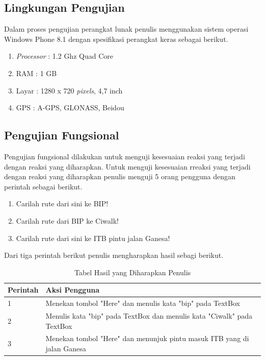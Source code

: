 \subsection{Lingkungan Pengujian}
\label{lab:Lingkungan Pengujian}
\hspace{0.5cm} Dalam proses pengujian perangkat lunak penulis menggunakan sistem operasi Windows Phone 8.1 dengan spesifikasi perangkat keras sebagai berikut.
\begin{enumerate}
	\item \textit{Processor} : 1.2 Ghz Quad Core
	\item RAM : 1 GB
	\item Layar : 1280 x 720 \textit{pixels}, 4,7 inch
	\item GPS : A-GPS, GLONASS, Beidou
\end{enumerate}

\subsection{Pengujian Fungsional}
\label{lab:Pengujian Fungsional}
\hspace{0.5cm} Pengujian fungsional dilakukan untuk menguji kesesuaian reaksi yang terjadi dengan reaksi yang diharapkan. Untuk menguji kesesuaian rreaksi yang terjadi dengan reaksi yang diharapkan penulis menguji 5 orang pengguna dengan perintah sebagai berikut. 
\begin{enumerate}
	\item Carilah rute dari sini ke BIP!
	\item Carilah rute dari BIP ke Ciwalk!
	\item Carilah rute dari sini ke ITB pintu jalan Ganesa!
\end{enumerate}

Dari tiga perintah berikut penulis mengharapkan hasil sebagi berikut.
\begin{table}[h]
	\centering
		\begin{tabular}{|p{2cm}|p{10cm}|}\hline
				Perintah & Aksi Pengguna \\ \hline
				1 & Menekan tombol "Here" dan menulis kata "bip" pada TextBox \\ \hline
				2 & Menulis kata "bip" pada TextBox dan menulis kata "Ciwalk" pada TextBox \\ \hline
				3 & Menekan tombol "Here" dan menunjuk pintu masuk ITB yang di jalan Ganesa \\ \hline
		\end{tabular}
	\caption{Tabel Hasil yang Diharapkan Penulis}
	\label{tab:TabelHasilyangdiharapkanPenulis}
\end{table}

